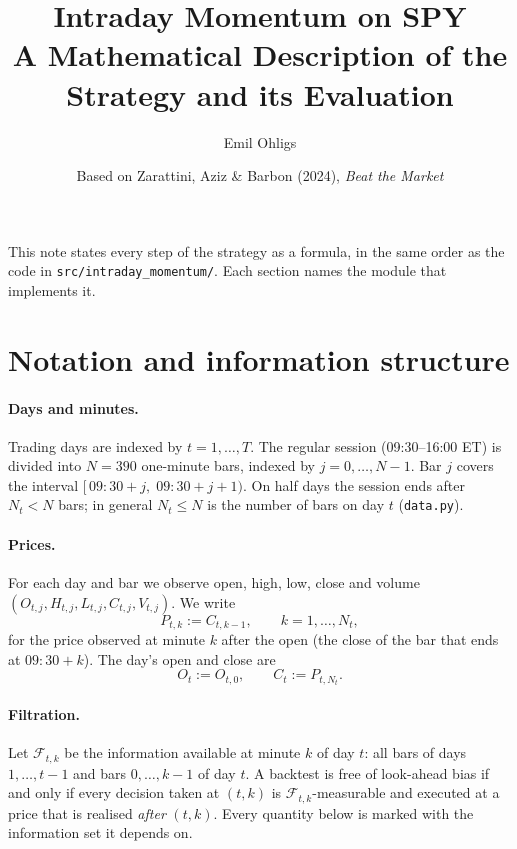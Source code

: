 \documentclass[11pt,a4paper]{article}
\title{Intraday Momentum on SPY\\[2pt]\large A Mathematical Description of the Strategy and its Evaluation}
\author{Emil Ohligs}
\date{Based on Zarattini, Aziz \& Barbon (2024), \emph{Beat the Market}}
\newcommand{\1}{\mathbf{1}}
\begin{document}
\maketitle

\noindent This note states every step of the strategy as a formula, in the same order as the code in
\texttt{src/intraday\_momentum/}. Each section names the module that implements it.

\tableofcontents

\section{Notation and information structure}

\paragraph{Days and minutes.}
Trading days are indexed by $t = 1,\dots,T$. The regular session (09:30--16:00 ET) is divided into
$N = 390$ one-minute bars, indexed by $j = 0,\dots,N-1$. Bar $j$ covers the interval
$[\,09{:}30 + j,\; 09{:}30 + j + 1)$. On half days the session ends after $N_t < N$ bars;
in general $N_t \le N$ is the number of bars on day $t$ (\texttt{data.py}).

\paragraph{Prices.} For each day and bar we observe open, high, low, close and volume
$(O_{t,j}, H_{t,j}, L_{t,j}, C_{t,j}, V_{t,j})$. We write
\[
  P_{t,k} := C_{t,k-1}, \qquad k = 1,\dots,N_t,
\]
for the price observed at minute $k$ after the open (the close of the bar that ends at $09{:}30+k$).
The day's open and close are
\[
  O_t := O_{t,0}, \qquad C_t := P_{t,N_t}.
\]

\paragraph{Filtration.} Let $\mathcal F_{t,k}$ be the information available at minute $k$ of day $t$:
all bars of days $1,\dots,t-1$ and bars $0,\dots,k-1$ of day $t$.
A backtest is free of look-ahead bias if and only if every decision taken at $(t,k)$ is
$\mathcal F_{t,k}$-measurable and executed at a price that is realised \emph{after} $(t,k)$.
Every quantity below is marked with the information set it depends on.
\end{document}
